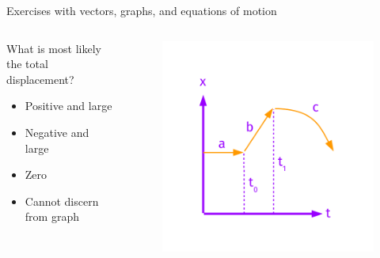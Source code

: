 \documentclass{beamer}
\begin{document}
\begin{frame}{Exercises with vectors, graphs, and equations of motion}
\begin{columns}[T]
\begin{column}{0.4\textwidth}
\small
What is most likely the total displacement?
\begin{itemize}
\item Positive and large
\item Negative and large
\item Zero
\item Cannot discern from graph
\end{itemize}
\end{column}
\begin{column}{0.6\textwidth}
\begin{figure}
\centering
\includegraphics[width=\textwidth,trim=0cm 0cm 0cm 1.5cm,clip=true]{figures/FurtherExercises.pdf}
\end{figure}
\end{column}
\end{columns}
\end{frame}
\end{document}
